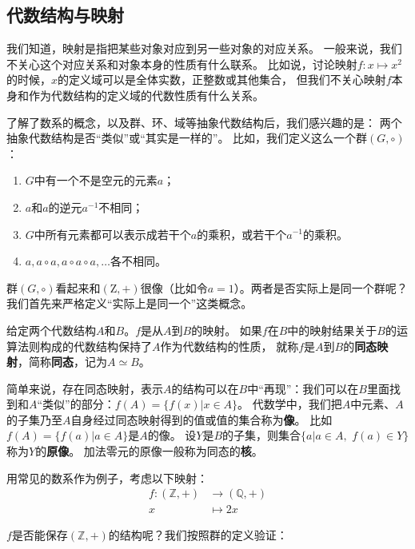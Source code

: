 \documentclass[12pt,UTF8,fontset=none]{ctexbook}
\begin{document}
\begin{appendix}
\section{代数结构与映射}
我们知道，映射是指把某些对象对应到另一些对象的对应关系。
一般来说，我们不关心这个对应关系和对象本身的性质有什么联系。
比如说，讨论映射$f: x \mapsto x^2$的时候，$x$的定义域可以是全体实数，正整数或其他集合，
但我们不关心映射$f$本身和作为代数结构的定义域的代数性质有什么关系。

了解了数系的概念，以及群、环、域等抽象代数结构后，我们感兴趣的是：
两个抽象代数结构是否“类似”或“其实是一样的”。
比如，我们定义这么一个群$(G,\circ)$：
\begin{enumerate}
    \item $G$中有一个不是空元的元素$a$；
    \item $a$和$a$的逆元$a^{-1}$不相同；
    \item $G$中所有元素都可以表示成若干个$a$的乘积，或若干个$a^{-1}$的乘积。
    \item $a, a\circ a, a\circ a \circ a, \ldots $各不相同。
\end{enumerate}

群$(G,\circ)$看起来和$\left(\mathrm{Z}, +\right)$很像（比如令$a = 1$）。两者是否实际上是同一个群呢？
我们首先来严格定义“实际上是同一个”这类概念。

\begin{df}\label{df:0_4}
    给定两个代数结构$A$和$B$。$f$是从$A$到$B$的映射。
    如果$f$在$B$中的映射结果关于$B$的运算法则构成的代数结构保持了$A$作为代数结构的性质，
    就称$f$是$A$到$B$的\textbf{同态映射}，简称\textbf{同态}，记为$A \simeq B$。
\end{df}

简单来说，存在同态映射，表示$A$的结构可以在$B$中“再现”：我们可以在$B$里面找到和$A$“类似”的部分：$f(A) = \{f(x) | x \in A\}$。
代数学中，我们把$A$中元素、$A$的子集乃至$A$自身经过同态映射得到的值或值的集合称为\textbf{像}。
比如$f(A) = \{f(a) | a \in A\}$是$A$的像。
设$Y$是$B$的子集，则集合$\{a |a \in A, \,\, f(a) \in Y\}$称为$Y$的\textbf{原像}。
加法零元的原像一般称为同态的\textbf{核}。

用常见的数系作为例子，考虑以下映射：
\begin{align*}
    f : \left(\mathbb{Z},+\right) &\rightarrow \left(\mathbb{Q},+\right)  \\
        x          &\mapsto 2 x 
\end{align*}

$f$是否能保存$\left(\mathbb{Z},+\right)$的结构呢？我们按照群的定义验证：


\end{appendix}
\end{document}
